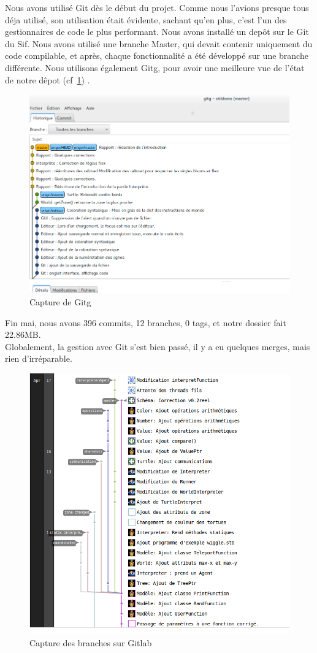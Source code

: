 Nous avons utilisé Git dès le début du projet. Comme nous l'avions presque tous déja utilisé, son utilisation était évidente, sachant qu'en plus, c'est l'un des gestionnaires de code le plus performant.
Nous avons installé un depôt sur le Git du Sif. Nous avons utilisé une branche Master, qui devait contenir uniquement du code compilable, et après, chaque fonctionnalité a été développé sur une branche différente.
Nous utilisons également Gitg, pour avoir une meilleure vue de l'état de notre dêpot (cf~\ref{Gitg}) .
\begin{figure}[h]
\caption{\label{Gitg} Capture de Gitg}
\includegraphics[scale=0.35]{doc/gestionProjet/gitbranche.png}
\end{figure}
Fin mai, nous avons 396 commits, 12 branches, 0 tags, et notre dossier fait 22.86MB.\\
Globalement, la gestion avec Git s'est bien passé, il y a eu quelques merges, mais rien d'irréparable. 
\begin{figure}[h]
\caption{\label{branche} Capture des branches sur Gitlab}
\includegraphics[scale=0.35]{doc/report/uml/network-v3.png}
\end{figure}
